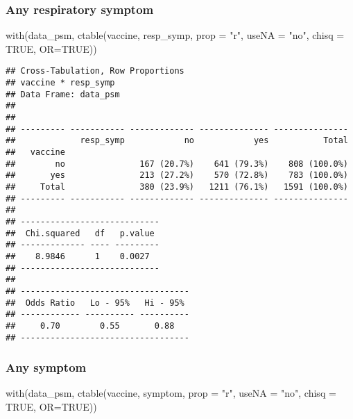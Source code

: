 \documentclass[
]{article}
\newenvironment{Shaded}{\begin{snugshade}}{\end{snugshade}}
\newcommand{\AttributeTok}[1]{\textcolor[rgb]{0.77,0.63,0.00}{#1}}
\newcommand{\ConstantTok}[1]{\textcolor[rgb]{0.00,0.00,0.00}{#1}}
\newcommand{\FunctionTok}[1]{\textcolor[rgb]{0.00,0.00,0.00}{#1}}
\newcommand{\NormalTok}[1]{#1}
\newcommand{\StringTok}[1]{\textcolor[rgb]{0.31,0.60,0.02}{#1}}
\begin{document}
\hypertarget{any-respiratory-symptom-1}{%
\subsubsection{Any respiratory
symptom}\label{any-respiratory-symptom-1}}

\begin{Shaded}
\begin{Highlighting}[]
\FunctionTok{with}\NormalTok{(data\_psm, }\FunctionTok{ctable}\NormalTok{(vaccine, resp\_symp, }\AttributeTok{prop =} \StringTok{"r"}\NormalTok{, }\AttributeTok{useNA =} \StringTok{"no"}\NormalTok{, }\AttributeTok{chisq =} \ConstantTok{TRUE}\NormalTok{, }\AttributeTok{OR=}\ConstantTok{TRUE}\NormalTok{))}
\end{Highlighting}
\end{Shaded}

\begin{verbatim}
## Cross-Tabulation, Row Proportions  
## vaccine * resp_symp  
## Data Frame: data_psm  
## 
## 
## --------- ----------- ------------- -------------- ---------------
##             resp_symp            no            yes           Total
##   vaccine                                                         
##        no               167 (20.7%)    641 (79.3%)    808 (100.0%)
##       yes               213 (27.2%)    570 (72.8%)    783 (100.0%)
##     Total               380 (23.9%)   1211 (76.1%)   1591 (100.0%)
## --------- ----------- ------------- -------------- ---------------
## 
## ----------------------------
##  Chi.squared   df   p.value 
## ------------- ---- ---------
##    8.9846      1    0.0027  
## ----------------------------
## 
## ----------------------------------
##  Odds Ratio   Lo - 95%   Hi - 95% 
## ------------ ---------- ----------
##     0.70        0.55       0.88   
## ----------------------------------
\end{verbatim}

\hypertarget{any-symptom-1}{%
\subsubsection{Any symptom}\label{any-symptom-1}}

\begin{Shaded}
\begin{Highlighting}[]
\FunctionTok{with}\NormalTok{(data\_psm, }\FunctionTok{ctable}\NormalTok{(vaccine, symptom, }\AttributeTok{prop =} \StringTok{"r"}\NormalTok{, }\AttributeTok{useNA =} \StringTok{"no"}\NormalTok{, }\AttributeTok{chisq =} \ConstantTok{TRUE}\NormalTok{, }\AttributeTok{OR=}\ConstantTok{TRUE}\NormalTok{))}
\end{Highlighting}
\end{Shaded}
\end{document}
